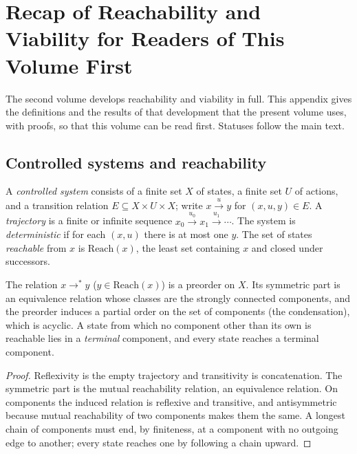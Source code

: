 \chapter[Recap of Reachability and Viability]{Recap of Reachability and Viability for Readers of This Volume First}\label{app:recap}

The second volume develops reachability and viability in full. This appendix gives the definitions and the results of that development that the present volume uses, with proofs, so that this volume can be read first. Statuses follow the main text.

\section{Controlled systems and reachability}

A \emph{controlled system} consists of a finite set $X$ of states, a finite set $U$ of actions, and a transition relation $E\subseteq X\times U\times X$; write $x\xrightarrow{u}y$ for $(x,u,y)\in E$. A \emph{trajectory} is a finite or infinite sequence $x_0\xrightarrow{u_0}x_1\xrightarrow{u_1}\cdots$. The system is \emph{deterministic} if for each $(x,u)$ there is at most one $y$. The set of states \emph{reachable} from $x$ is $\mathrm{Reach}(x)$, the least set containing $x$ and closed under successors.

\begin{newresult}\label{pr:reach}
The relation $x\to^*y$ ($y\in\mathrm{Reach}(x)$) is a preorder on $X$. Its symmetric part is an equivalence relation whose classes are the strongly connected components, and the preorder induces a partial order on the set of components (the condensation), which is acyclic. A state from which no component other than its own is reachable lies in a \emph{terminal} component, and every state reaches a terminal component.
\end{newresult}
\begin{proof}
Reflexivity is the empty trajectory and transitivity is concatenation. The symmetric part is the mutual reachability relation, an equivalence relation. On components the induced relation is reflexive and transitive, and antisymmetric because mutual reachability of two components makes them the same. A longest chain of components must end, by finiteness, at a component with no outgoing edge to another; every state reaches one by following a chain upward.
\end{proof}

